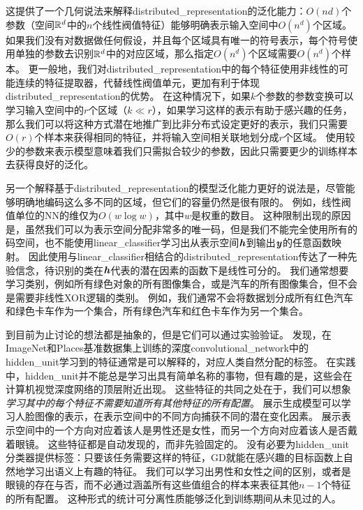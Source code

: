 
这提供了一个几何说法来解释\gls{distributed_representation}的泛化能力：$O(nd)$个参数（空间$\mathbb{R}^d$中的$n$个线性阀值特征）能够明确表示输入空间中$O(n^d)$个区域。
如果我们没有对数据做任何假设，并且每个区域具有唯一的符号表示，每个符号使用单独的参数去识别$\mathbb{R}^d$中的对应区域，那么指定$O(n^d)$个区域需要$O(n^d)$个样本。
更一般地，我们对\gls{distributed_representation}中的每个特征使用非线性的可能连续的特征提取器，代替线性阀值单元，更加有利于体现\gls{distributed_representation}的优势。
在这种情况下，如果$k$个参数的参数变换可以学习输入空间中的$r$个区域（$k\ll r$），如果学习这样的表示有助于感兴趣的任务，那么我们可以将这种方式潜在地推广到比非分布式设定更好的表示，我们只需要$O(r)$个样本来获得相同的特征，并将输入空间相关联地划分成$r$个区域。
使用较少的参数来表示模型意味着我们只需拟合较少的参数，因此只需要更少的训练样本去获得良好的泛化。


另一个解释基于\gls{distributed_representation}的模型泛化能力更好的说法是，尽管能够明确地编码这么多不同的区域，但它们的容量仍然是很有限的。
例如，线性阀值单位的\gls{NN}的维仅为$O(w\log w)$，其中$w$是权重的数目\citep{sontag1998vc}。
这种限制出现的原因是，虽然我们可以为表示空间分配非常多的唯一码，但是我们不能完全使用所有的码空间，也不能使用\gls{linear_classifier}学习出从表示空间$\boldsymbol{\mathit{h}}$到输出$\boldsymbol{\mathit{y}}$的任意函数映射。
因此使用与\gls{linear_classifier}相结合的\gls{distributed_representation}传达了一种先验信念，待识别的类在$\boldsymbol{\mathit{h}}$代表的潜在因素的函数下是线性可分的。
我们通常想要学习类别，例如所有绿色对象的所有图像集合，或是汽车的所有图像集合，但不会是需要非线性XOR逻辑的类别。
例如，我们通常不会将数据划分成所有红色汽车和绿色卡车作为一个集合，所有绿色汽车和红色卡车作为另一个集合。


到目前为止讨论的想法都是抽象的，但是它们可以通过实验验证。
\cite{Zhou-et-al-ICLR2015}发现，在ImageNet和Places基准数据集上训练的深度\gls{convolutional_network}中的\gls{hidden_unit}学习到的特征通常是可以解释的，对应人类自然分配的标签。
在实践中，\gls{hidden_unit}并不能总是学习出具有简单名称的事物，但有趣的是，这些会在计算机视觉深度网络的顶层附近出现。
这些特征的共同之处在于，我们可以想象\emph{学习其中的每个特征不需要知道所有其他特征的所有配置}。
\cite{radford2015unsupervised}展示生成模型可以学习人脸图像的表示，在表示空间中的不同方向捕获不同的潜在变化因素。
展示表示空间中的一个方向对应着该人是男性还是女性，而另一个方向对应着该人是否戴着眼镜。
这些特征都是自动发现的，而非先验固定的。
没有必要为\gls{hidden_unit}分类器提供标签：只要该任务需要这样的特征，\gls{GD}就能在感兴趣的目标函数上自然地学习出语义上有趣的特征。
我们可以学习出男性和女性之间的区别，或者是眼镜的存在与否，而不必通过涵盖所有这些值组合的样本来表征其他$n-1$个特征的所有配置。
这种形式的统计可分离性质能够泛化到训练期间从未见过的人。


